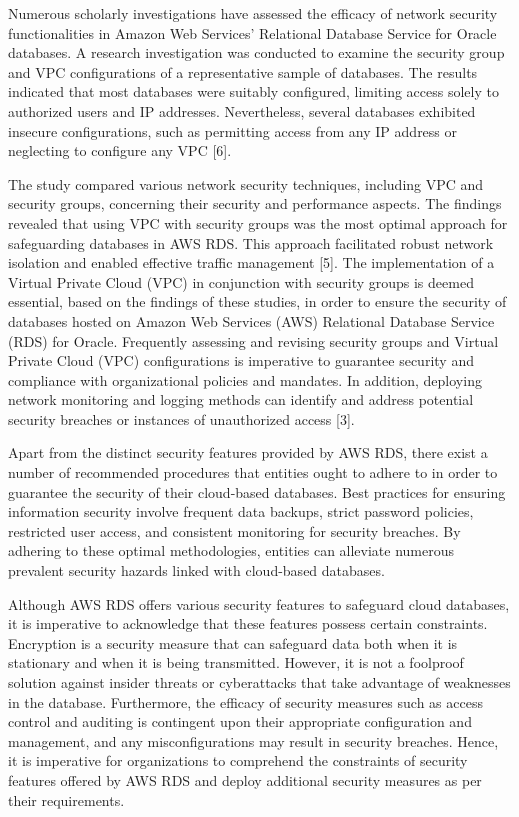 \documentclass{ieee}
\begin{document}
Numerous scholarly investigations have assessed the efficacy of network security functionalities in Amazon Web Services' Relational Database Service for Oracle databases. A research investigation was conducted to examine the security group and VPC configurations of a representative sample of databases. The results indicated that most databases were suitably configured, limiting access solely to authorized users and IP addresses. Nevertheless, several databases exhibited insecure configurations, such as permitting access from any IP address or neglecting to configure any VPC [6].

The study compared various network security techniques, including VPC and security groups, concerning their security and performance aspects. The findings revealed that using VPC with security groups was the most optimal approach for safeguarding databases in AWS RDS. This approach facilitated robust network isolation and enabled effective traffic management [5]. The implementation of a Virtual Private Cloud (VPC) in conjunction with security groups is deemed essential, based on the findings of these studies, in order to ensure the security of databases hosted on Amazon Web Services (AWS) Relational Database Service (RDS) for Oracle. Frequently assessing and revising security groups and Virtual Private Cloud (VPC) configurations is imperative to guarantee security and compliance with organizational policies and mandates. In addition, deploying network monitoring and logging methods can identify and address potential security breaches or instances of unauthorized access [3].


Apart from the distinct security features provided by AWS RDS, there exist a number of recommended procedures that entities ought to adhere to in order to guarantee the security of their cloud-based databases. Best practices for ensuring information security involve frequent data backups, strict password policies, restricted user access, and consistent monitoring for security breaches. By adhering to these optimal methodologies, entities can alleviate numerous prevalent security hazards linked with cloud-based databases.


Although AWS RDS offers various security features to safeguard cloud databases, it is imperative to acknowledge that these features possess certain constraints. Encryption is a security measure that can safeguard data both when it is stationary and when it is being transmitted. However, it is not a foolproof solution against insider threats or cyberattacks that take advantage of weaknesses in the database. Furthermore, the efficacy of security measures such as access control and auditing is contingent upon their appropriate configuration and management, and any misconfigurations may result in security breaches. Hence, it is imperative for organizations to comprehend the constraints of security features offered by AWS RDS and deploy additional security measures as per their requirements.
\end{document}
